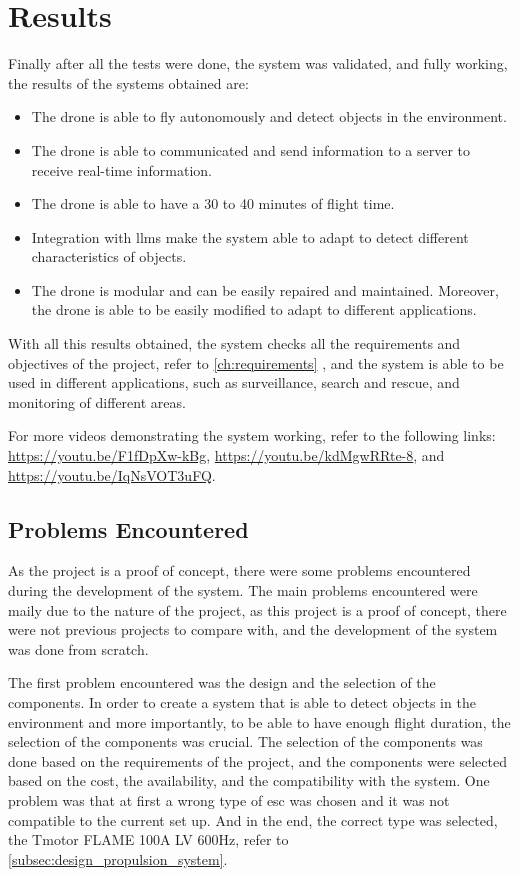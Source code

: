 \chapter{Results}\label{ch:results}

Finally after all the tests were done, the system was validated, and fully working, the results of the systems obtained are:

\begin{itemize}
	\item The drone is able to fly autonomously and detect objects in the environment.
	\item The drone is able to communicated and send information to a server to receive real-time information.
	\item The drone is able to have a 30 to 40 minutes of flight time.
	\item Integration with \glspl{llm} make the system able to adapt to detect different characteristics of objects.
	\item The drone is modular and can be easily repaired and maintained. Moreover, the drone is able to be easily modified to adapt to different applications.
\end{itemize}

With all this results obtained, the system checks all the requirements and objectives of the project, refer to \cref{ch:requirements} , and the system is able to be used in different applications, such as surveillance, search and rescue, and monitoring of different areas.

For more videos demonstrating the system working, refer to the following links: \url{https://youtu.be/F1fDpXw-kBg}, \url{https://youtu.be/kdMgwRRte-8}, and \url{https://youtu.be/IqNsVOT3uFQ}.

\section{Problems Encountered}\label{sec:problems_encountered}

As the project is a proof of concept, there were some problems encountered during the development of the system. The main problems encountered were maily due to the nature of the project, as this project is a proof of concept, there were not previous projects to compare with, and the development of the system was done from scratch.

The first problem encountered was the design and the selection of the components. In order to create a system that is able to detect objects in the environment and more importantly, to be able to have enough flight duration, the selection of the components was crucial. The selection of the components was done based on the requirements of the project, and the components were selected based on the cost, the availability, and the compatibility with the system. One problem was that at first a wrong type of \gls{esc} was chosen and it was not compatible to the current set up. And in the end, the correct type was selected, the Tmotor FLAME 100A LV 600Hz, refer to \cref{subsec:design_propulsion_system}.

